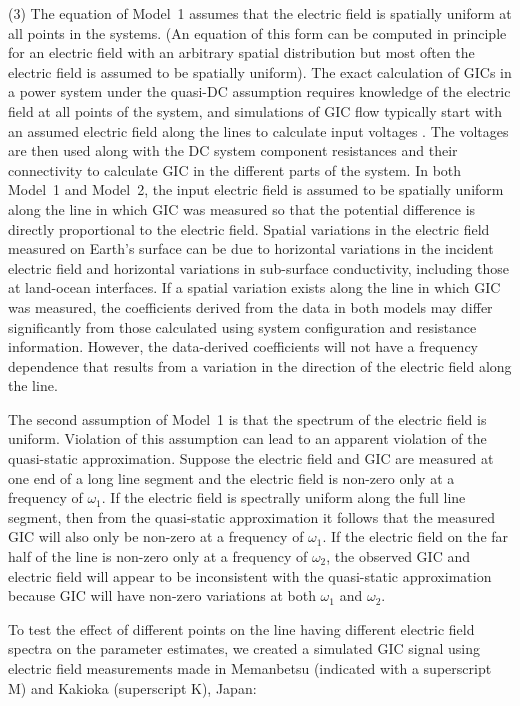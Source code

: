 \documentclass[draft,linenumbers]{agujournal2018}
\begin{document}
(3) The equation of Model~1 assumes that the electric field is spatially uniform at all points in the systems. (An equation of this form can be computed in principle for an electric field with an arbitrary spatial distribution but most often the electric field is assumed to be spatially uniform). The exact calculation of GICs in a power system under the quasi-DC assumption requires knowledge of the electric field at all points of the system, and simulations of GIC flow typically start with an assumed electric field along the lines to calculate input voltages \citep{Albertson1981,Lehtinen1985, Horton2012}. The voltages are then used along with the DC system component resistances and their connectivity to calculate GIC in the different parts of the system. In both Model~1 and Model~2, the input electric field is assumed to be spatially uniform along the line in which GIC was measured so that the potential difference is directly proportional to the electric field. Spatial variations in the electric field measured on Earth's surface can be due to horizontal variations in the incident electric field and horizontal variations in sub-surface conductivity, including those at land-ocean interfaces. If a spatial variation exists along the line in which GIC was measured, the coefficients derived from the data in both models may differ significantly from those calculated using system configuration and resistance information. However, the data-derived coefficients will not have a frequency dependence that results from a variation in the direction of the electric field along the line.

The second assumption of Model~1 is that the spectrum of the electric field is uniform. Violation of this assumption can lead to an apparent violation of the quasi-static approximation. Suppose the electric field and GIC are measured at one end of a long line segment and the electric field is non-zero only at a frequency of $\omega_1$. If the electric field is spectrally uniform along the full line segment, then from the quasi-static approximation it follows that the measured GIC will also only be non-zero at a frequency of $\omega_1$. If the electric field on the far half of the line is non-zero only at a frequency of $\omega_2$, the observed GIC and electric field will appear to be inconsistent with the quasi-static approximation because GIC will have non-zero variations at both $\omega_1$ and $\omega_2$.

To test the effect of different points on the line having different electric field spectra on the parameter estimates, we created a simulated GIC signal using electric field measurements made in Memanbetsu (indicated with a superscript M) and Kakioka (superscript K), Japan:
\end{document}
